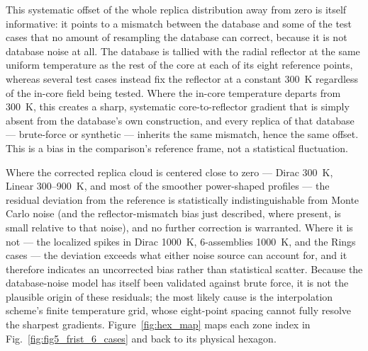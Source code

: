 \documentclass{style/nseJournal}
\begin{document}
This systematic offset of the whole replica distribution away from zero is itself informative: it points to a mismatch between the database and some of the test cases that no amount of resampling the database can correct, because it is not database noise at all. The database is tallied with the radial reflector at the same uniform temperature as the rest of the core at each of its eight reference points, whereas several test cases instead fix the reflector at a constant 300~K regardless of the in-core field being tested. Where the in-core temperature departs from 300~K, this creates a sharp, systematic core-to-reflector gradient that is simply absent from the database's own construction, and every replica of that database --- brute-force or synthetic --- inherits the same mismatch, hence the same offset. This is a bias in the comparison's reference frame, not a statistical fluctuation.

Where the corrected replica cloud is centered close to zero --- Dirac 300~K, Linear 300--900~K, and most of the smoother power-shaped profiles --- the residual deviation from the reference is statistically indistinguishable from Monte Carlo noise (and the reflector-mismatch bias just described, where present, is small relative to that noise), and no further correction is warranted. Where it is not --- the localized spikes in Dirac 1000~K, 6-assemblies 1000~K, and the Rings cases --- the deviation exceeds what either noise source can account for, and it therefore indicates an uncorrected bias rather than statistical scatter. Because the database-noise model has itself been validated against brute force, it is not the plausible origin of these residuals; the most likely cause is the interpolation scheme's finite temperature grid, whose eight-point spacing cannot fully resolve the sharpest gradients. Figure~\ref{fig:hex_map} maps each zone index in Fig.~\ref{fig:fig5_frist_6_cases} and back to its physical hexagon.



\end{document}

